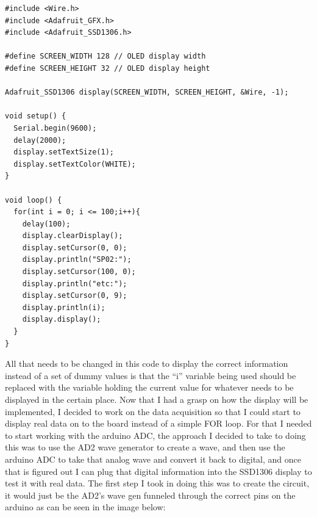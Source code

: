 \documentclass{article}
\begin{document}
\begin{lstlisting}[language=Arduino, caption=Display Code]
#include <Wire.h>
#include <Adafruit_GFX.h>
#include <Adafruit_SSD1306.h> 

#define SCREEN_WIDTH 128 // OLED display width
#define SCREEN_HEIGHT 32 // OLED display height

Adafruit_SSD1306 display(SCREEN_WIDTH, SCREEN_HEIGHT, &Wire, -1);

void setup() {
  Serial.begin(9600);
  delay(2000);
  display.setTextSize(1);
  display.setTextColor(WHITE);
}

void loop() {
  for(int i = 0; i <= 100;i++){
    delay(100);
    display.clearDisplay();
    display.setCursor(0, 0);
    display.println("SP02:");
    display.setCursor(100, 0);
    display.println("etc:"); 
    display.setCursor(0, 9);
    display.println(i);
    display.display();
  }
}

\end{lstlisting}
All that needs to be changed in this code to display the correct information instead of a set of dummy values is that the “i” variable being used should be replaced with the variable holding the current value for whatever needs to be displayed in the certain place.
\newpage
Now that I had a grasp on how the display will be implemented, I decided to work on the data acquisition so that I could start to display real data on to the board instead of a simple FOR loop. For that I needed to start working with the arduino ADC, the approach I decided to take to doing this was to use the AD2 wave generator to create a wave, and then use the arduino ADC to take that analog wave and convert it back to digital, and once that is figured out I can plug that digital information into the SSD1306 display to test it with real data.
The first step I took in doing this was to create the circuit, it would just be the AD2’s wave gen funneled through the correct pins on the arduino as can be seen in the image below:
\begin{center}
\end{center}
\end{document}
